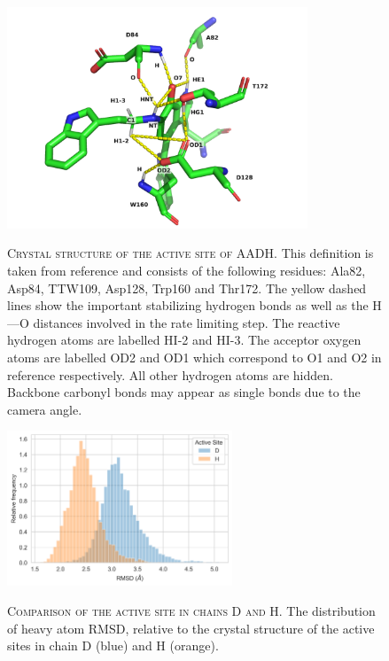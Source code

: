 \begin{figure}
    \centering
    \caption[Crystal structure of the active site of AADH]{\textsc{Crystal structure of the active site of AADH}. This definition is taken from reference \cite{ranaghanInitioQMMM2017} and consists of the following residues: Ala82, Asp84, TTW109, Asp128, Trp160 and Thr172. The yellow dashed lines show the important stabilizing hydrogen bonds as well as the H---O distances involved in the rate limiting step.  The reactive hydrogen atoms are labelled HI-2 and HI-3. The acceptor oxygen atoms are labelled OD2 and OD1 which correspond to O1 and O2 in reference \cite{masgrauAtomicDescriptionEnzyme2006} respectively. All other hydrogen atoms are hidden. Backbone carbonyl bonds may appear as single bonds due to the camera angle.}
    \includegraphics[width=0.8\textwidth]{chapters/aadh/figures/aadh_active_site.png}
    \label{fig:aadh_active_site}
\end{figure}

\begin{figure}
    \centering
    \caption[Comparison of the active site in chains D and H]{\textsc{Comparison of the active site in chains D and H}. The distribution of heavy atom RMSD, relative to the crystal structure of the active sites in chain D (blue) and H (orange). }
    \includegraphics[width=0.6\textwidth]{chapters/aadh/figures/rmsd_dististribution.png}
    \label{fig:as_rmsd_dist}
\end{figure}

